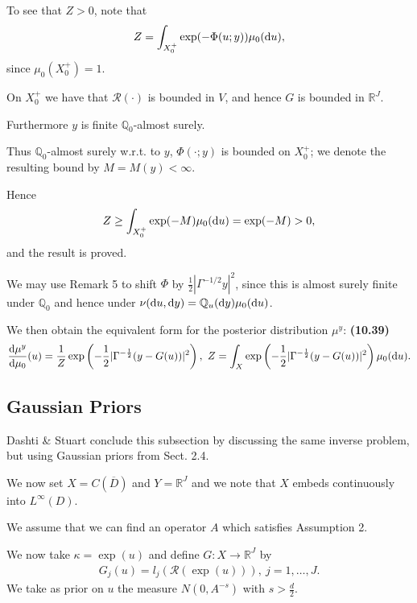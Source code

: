 \documentclass[oneside,11pt]{book}
\numberwithin{equation}{section}
\begin{document}
To see that $Z > 0$, note that
\begin{align*}
    Z = \int_{X_0^+} \exp(-\Phi(u;y))\mu_0({\rm d}u),
\end{align*}
since $\mu_0(X_0^+) = 1$.

On $X_0^+$ we have that $\mathcal{R}(\cdot)$ is bounded in $V$, and hence $G$ is bounded in $\mathbb{R}^J$.

Furthermore $y$ is finite $\mathbb{Q}_0$-almost surely.

Thus $\mathbb{Q}_0$-almost surely w.r.t. to $y$, $\Phi(\cdot;y)$ is bounded on $X_0^+$; we denote the resulting bound by $M = M(y) < \infty$.

Hence
\begin{align*}
    Z\ge\int_{X_0^+} \exp(-M)\mu_0({\rm d}u) = \exp(-M) > 0,
\end{align*}
and the result is proved.

%
We may use Remark 5 to shift $\Phi$ by $\frac{1}{2}|\Gamma^{-1/2}y|^2$, since this is almost surely finite under $\mathbb{Q}_0$ and hence under $\nu({\rm d}u,{\rm d}y) = \mathbb{Q}_u({\rm d}y)\mu_0({\rm d}u)$.

We then obtain the equivalent form for the posterior distribution $\mu^y$: \textbf{(10.39)}
\begin{align*}
    \frac{{\rm d}\mu^y}{{\rm d}\mu_0}(u) = \frac{1}{Z}\exp\left(-\frac{1}{2}|\Gamma^{-\frac{1}{2}}(y - G(u))|^2\right),\ Z = \int_X \exp\left(-\frac{1}{2}|\Gamma^{-\frac{1}{2}}(y - G(u))|^2\right)\mu_0({\rm d}u).
\end{align*}

\subsection{Gaussian Priors}
Dashti \& Stuart conclude this subsection by discussing the same inverse problem, but using Gaussian priors from Sect. 2.4.

We now set $X = C(\overline{D})$ and $Y = \mathbb{R}^J$ and we note that $X$ embeds continuously into $L^\infty(D)$.

We assume that we can find an operator $A$ which satisfies Assumption 2.

We now take $\kappa = \exp(u)$ and define $G:X\to\mathbb{R}^J$ by
\begin{align*}
    G_j(u) = l_j(\mathcal{R}(\exp(u))),\ j = 1,\ldots,J.
\end{align*}
We take as prior on $u$ the measure $N(0,A^{-s})$ with $s > \frac{d}{2}$.
\end{document}
